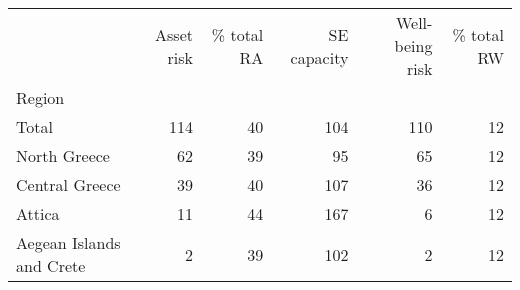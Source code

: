 \begin{tabular}{lrrrrr}
\toprule
{} &  Asset risk &  \% total RA &  SE capacity &  Well-being risk &  \% total RW \\
Region                   &             &             &              &                  &             \\
\midrule
Total                    &         114 &          40 &          104 &              110 &          12 \\
North Greece             &          62 &          39 &           95 &               65 &          12 \\
Central Greece           &          39 &          40 &          107 &               36 &          12 \\
Attica                   &          11 &          44 &          167 &                6 &          12 \\
Aegean Islands and Crete &           2 &          39 &          102 &                2 &          12 \\
\bottomrule
\end{tabular}
